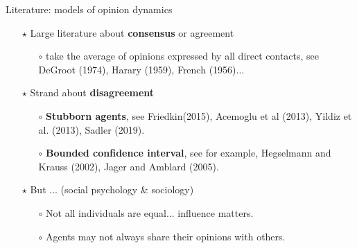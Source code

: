\documentclass[xcolor=table,handout]{beamer}
\begin{document}
\begin{frame}{Literature: models of opinion dynamics}

		\begin{itemize} \setlength\itemsep{1em}
			\item[$\star$] Large literature about {\bf\color{purple}consensus} or agreement
				\begin{itemize} \smallskip
				
					\item[$\circ$] take the average of opinions expressed by all direct contacts, see DeGroot (1974), Harary (1959), French (1956)...
				\end{itemize} 
			\item[$\star$] Strand about {\bf\color{purple}disagreement} \smallskip
				\begin{itemize} \setlength\itemsep{1em} 
				
					\item[$\circ$]  {\bf\color{purple}Stubborn agents}, see Friedkin(2015), Acemoglu et al (2013), Yildiz et al. (2013), Sadler (2019). %
					\item[$\circ$] {\bf\color{purple}Bounded confidence interval}, see for example, Hegselmann and Krauss (2002), Jager and Amblard (2005). %
				\end{itemize}
		
		\item[$\star$] But ... (social psychology \& sociology) 
			\begin{itemize}
				\item[$\circ$] Not all individuals are equal... influence matters. 
				\item[$\circ$] Agents may not always share their opinions with others.  
			\end{itemize}
		\end{itemize}
\end{frame}
%
\end{document}

